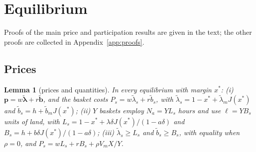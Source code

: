 \documentclass[12pt]{article}
\theoremstyle{plain}
\newtheorem{lemma}{Lemma}
\theoremstyle{definition}
\theoremstyle{remark}
\begin{document}
\section{Equilibrium}\label{sec:equilibrium}

Proofs of the main price and participation results are given in the text; the other proofs are collected in Appendix~\ref{app:proofs}.

\subsection{Prices}\label{sec:prices}

\begin{lemma}[prices and quantities]\label{lem:prices}
In every equilibrium with margin $x^*$:
(i) $\mathbf p=w\widetilde{\bm\lambda}+r\widetilde{\mathbf b}$, and the basket costs $P_s=w\widetilde\lambda_s+r\widetilde b_s$, with $\widetilde\lambda_s=1-x^*+\widetilde\lambda_mJ(x^*)$ and $\widetilde b_s=h+\widetilde b_mJ(x^*)$;
(ii) $Y$ baskets employ $N_a=YL_s$ hours and use $\ell=YB_s$ units of land, with $L_s=1-x^*+\lambda\delta J(x^*)/(1-a\delta)$ and $B_s=h+b\delta J(x^*)/(1-a\delta)$;
(iii) $\widetilde\lambda_s\ge L_s$ and $\widetilde b_s\ge B_s$, with equality when $\rho=0$, and $P_s=wL_s+rB_s+\rho V_mX/Y$.
\end{lemma}
\end{document}

